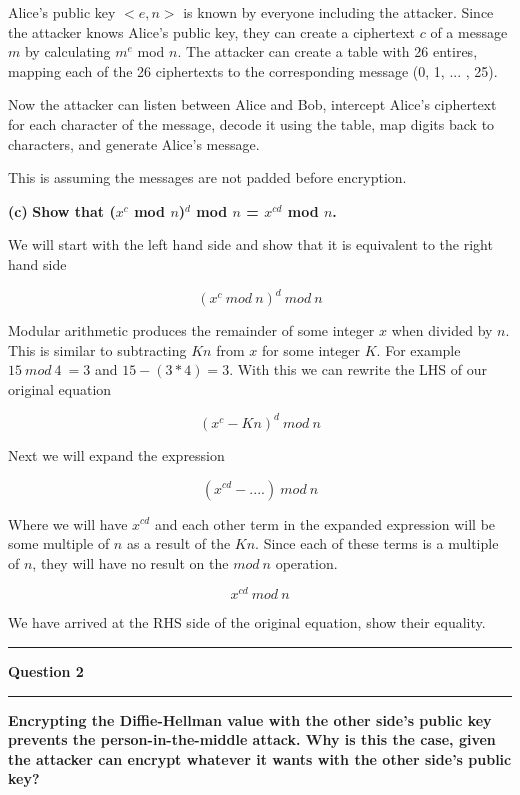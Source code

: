 \documentclass[11pt]{article}
\newcommand\question[2]{\vspace{.25in}\hrule\textbf{#1}\vspace{.5em}\hrule\vspace{.10in}}
\renewcommand\part[1]{\vspace{.10in}\textbf{(#1)}}
\begin{document}
Alice's public key ${<}e, n{>}$ is known by everyone including the attacker. Since the attacker knows Alice's public key, they can create a ciphertext $c$ of a message $m$ by calculating $m^e$ mod $n$. The attacker can create a table with 26 entires, mapping each of the 26 ciphertexts to the corresponding message (0, 1, ... , 25). 

Now the attacker can listen between Alice and Bob, intercept Alice's ciphertext for each character of the message, decode it using the table, map digits back to characters, and generate Alice's message.

This is assuming the messages are not padded before encryption.

\part{c} \textbf{Show that ($x^c$ mod $n$)$^d$ mod $n$ = $x^{cd}$ mod $n$.}

We will start with the left hand side and show that it is equivalent to the right hand side

$$(x^c \ mod \ n)^d \ mod \ n$$

Modular arithmetic produces the remainder of some integer $x$ when divided by $n$. This is similar to subtracting $Kn$ from $x$ for some integer $K$. For example $15 \ mod \ 4 \ = 3$ and $15 - (3 * 4) = 3$. With this we can rewrite the LHS of our original equation

$$(x^c - Kn)^d \ mod \ n$$

Next we will expand the expression

$$(x^{cd} - ....) \ mod \ n$$

Where we will have $x^{cd}$ and each other term in the expanded expression will be some multiple of $n$ as a result of the $Kn$. Since each of these terms is a multiple of $n$, they will have no result on the $mod \ n$ operation.

$$x^{cd} \ mod \ n$$

We have arrived at the RHS side of the original equation, show their equality.


\question{Question 2}

\part{a} \textbf{Encrypting the Diffie-Hellman value with the other side's public key prevents the person-in-the-middle attack. Why is this the case, given the attacker can encrypt whatever it wants with the other side's public key?}
\end{document}
